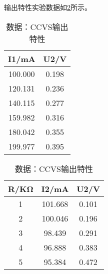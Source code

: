 \documentclass[dvipsnames, svgnames,a4paper,11pt]{article}
\begin{document}
\begin{enumerate}
		输出特性实验数据如\cref{tab:tabA2}所示。
		

		\begin{table}[htbp]
			\centering
			\begin{minipage}{.5\linewidth}
			  \centering
			  \caption{数据：CCVS转移特性}
			  \begin{tabular}{|c|c|}
				\hline
				I1/mA & U2/V \\
				\hline
				100.000 & 0.198 \\
				120.131 & 0.236 \\
				140.115 & 0.277 \\
				159.982 & 0.316 \\
				180.042 & 0.355 \\
				199.977 & 0.395 \\
				\hline
			\end{tabular}
			  \label{tab:tabA1}
			\end{minipage}%
			\begin{minipage}{.5\linewidth}
			  \centering
			  \caption{数据：CCVS输出特性}
			  \begin{tabular}{|c|c|c|}
				\hline
				R/KΩ & I2/mA & U2/V \\
				\hline
				1 & 101.668 & 0.101 \\
				2 & 100.046 & 0.196 \\
				3 & 98.439 & 0.291 \\
				4 & 96.888 & 0.383 \\
				5 & 95.384 & 0.472 \\
				\hline
			\end{tabular}
			  \label{tab:tabA2}
			\end{minipage}
			
			
		\end{table}

		
	\end{enumerate}	
	
\end{document}
